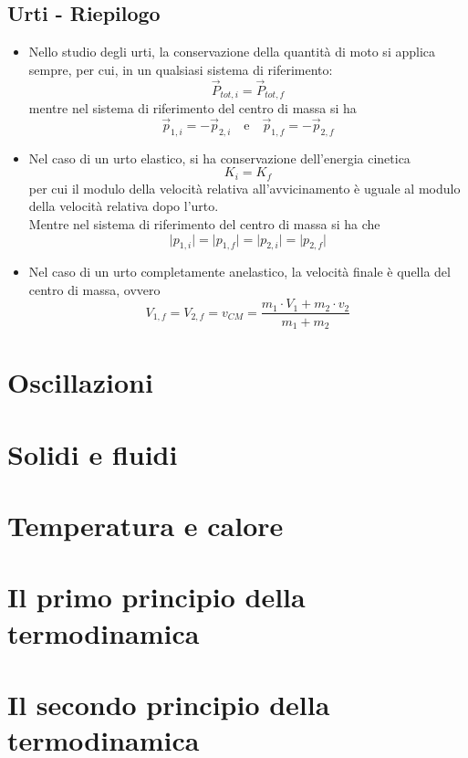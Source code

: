\documentclass[a4paper]{extarticle}
\begin{document}
\vspace{1em}
\subsection{Urti - Riepilogo}
\begin{itemize}
  \item Nello studio degli urti, la conservazione della quantità di moto si applica sempre, per cui, in un qualsiasi sistema di riferimento:
  \[\boxed{\vec P_{tot, i} = \vec P_{tot, f}}\]
  mentre nel sistema di riferimento del centro di massa si ha
  \[\boxed{\vec p_{1,i} = - \vec p_{2,i}} \hspace{1em} \text{e} \hspace{1em} \boxed{\vec p_{1,f} = - \vec p_{2,f}}\]

  \item Nel caso di un urto elastico, si ha conservazione dell'energia cinetica
  \[\boxed{K_i=K_f}\]
  per cui il modulo della velocità relativa all'avvicinamento è uguale al modulo della velocità relativa dopo l'urto.\\
  Mentre nel sistema di riferimento del centro di massa si ha che
  \[\boxed{\vert p_{1,i} \vert = \vert p_{1,f} \vert = \vert p_{2,i} \vert = \vert p_{2,f} \vert}\]

  \item Nel caso di un urto completamente anelastico, la velocità finale è quella del centro di massa, ovvero
  \[\boxed{V_{1,f} = V_{2,f} = v_{CM} = \frac{m_1 \cdot V_1 + m_2 \cdot v_2}{m_1 + m_2}}\]
\end{itemize}



\newpage
\section{Oscillazioni}

\newpage
\section{Solidi e fluidi}

\newpage
\section{Temperatura e calore}

\newpage
\section{Il primo principio della termodinamica}

\newpage
\section{Il secondo principio della termodinamica}
\end{document}

